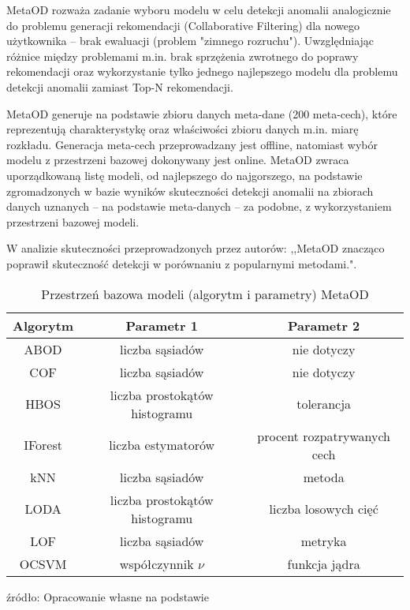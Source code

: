 MetaOD rozważa zadanie wyboru modelu w celu detekcji anomalii analogicznie
do problemu generacji rekomendacji (Collaborative Filtering) dla nowego użytkownika -- brak ewaluacji (problem "zimnego rozruchu"). Uwzględniając różnice między problemami m.in. brak sprzężenia zwrotnego do poprawy rekomendacji oraz wykorzystanie tylko jednego najlepszego modelu dla problemu detekcji anomalii zamiast Top-N rekomendacji.

MetaOD generuje na podstawie zbioru danych meta-dane (200 meta-cech), które reprezentują charakterystykę oraz właściwości zbioru danych m.in. miarę rozkładu. Generacja meta-cech przeprowadzany jest offline, natomiast wybór modelu z przestrzeni bazowej dokonywany jest online. MetaOD zwraca uporządkowaną listę modeli, od najlepszego do najgorszego, na podstawie zgromadzonych w bazie wyników skuteczności detekcji anomalii na zbiorach danych uznanych -- na podstawie meta-danych -- za podobne, z wykorzystaniem przestrzeni bazowej modeli.

W analizie skuteczności przeprowadzonych przez autorów: ,,MetaOD znacząco poprawił skuteczność detekcji w porównaniu z popularnymi metodami."\cite{zhao2020metaod}.



\begin{table}[h]
    \centering
    \begin{tabular}{c|c|c}
    Algorytm & Parametr 1 & Parametr 2 \\ \hline
    ABOD     & liczba sąsiadów & nie dotyczy \\
    COF & liczba sąsiadów & nie dotyczy \\
    HBOS & liczba prostokątów histogramu & tolerancja \\
    IForest & liczba estymatorów & procent rozpatrywanych cech \\
    kNN & liczba sąsiadów & metoda \\
    LODA & liczba prostokątów histogramu & liczba losowych cięć \\
    LOF & liczba sąsiadów & metryka \\
    OCSVM &współczynnik $\nu$ & funkcja jądra
    \end{tabular}
    \caption{Przestrzeń bazowa modeli (algorytm i parametry) MetaOD}
        \footnotesize{źródło: Opracowanie własne na podstawie \cite{zhao2020metaod}}
    \label{tab:my_label}
\end{table}